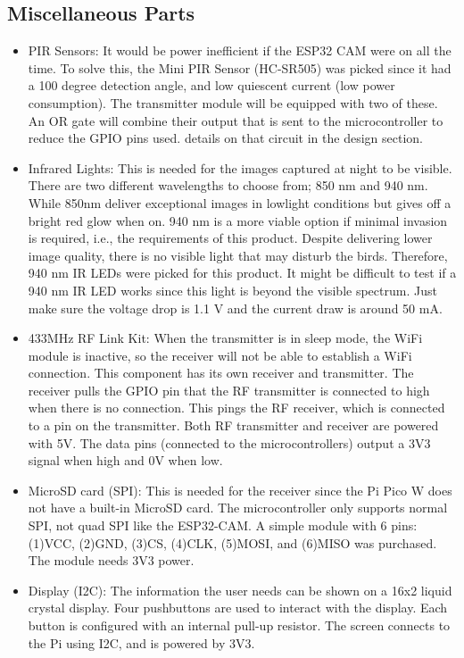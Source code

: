 \documentclass[class=report,11pt,crop=false]{standalone}
\begin{document}
\subsection{Miscellaneous Parts}
\begin{itemize}
    \item PIR Sensors: It would be power inefficient if the ESP32 CAM were on all the time. To solve this, the Mini PIR Sensor (HC-SR505) was picked since it had a 100 degree detection angle, and low quiescent current (low power consumption). The transmitter module will be equipped with two of these. An OR gate will combine their output that is sent to the microcontroller to reduce the GPIO pins used. details on that circuit in the design section. 
    \item Infrared Lights: This is needed for the images captured at night to be visible. There are two different wavelengths to choose from; 850 nm and 940 nm. While 850nm deliver exceptional images in lowlight conditions but gives off a bright red glow when on. 940 nm is a more viable option if minimal invasion is required, i.e., the requirements of this product. Despite delivering lower image quality, there is no visible light that may disturb the birds. Therefore, 940 nm IR LEDs were picked for this product. It might be difficult to test if a 940 nm IR LED works since this light is beyond the visible spectrum. Just make sure the voltage drop is 1.1 V and the current draw is around 50 mA. 
    \item 433MHz RF Link Kit: When the transmitter is in sleep mode, the WiFi module is inactive, so the receiver will not be able to establish a WiFi connection. This component has its own receiver and transmitter. The receiver pulls the GPIO pin that the RF transmitter is connected to high when there is no connection. This pings the RF receiver, which is connected to a pin on the transmitter. Both RF transmitter and receiver are powered with 5V. The data pins (connected to the microcontrollers) output a 3V3 signal when high and 0V when low. 
    \item MicroSD card (SPI): This is needed for the receiver since the Pi Pico W does not have a built-in MicroSD card. The microcontroller only supports normal SPI, not quad SPI like the ESP32-CAM. A simple module with 6 pins: (1)VCC, (2)GND, (3)CS, (4)CLK, (5)MOSI, and (6)MISO was purchased. The module needs 3V3 power. 
    \item Display (I2C): The information the user needs can be shown on a 16x2 liquid crystal display. Four pushbuttons are used to interact with the display. Each button is configured with an internal pull-up resistor. The screen connects to the Pi using I2C, and is powered by 3V3. 
\end{itemize}
\end{document}
